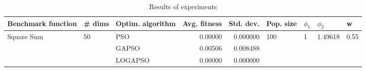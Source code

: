 \begin{table}
\centering
\caption{Results of experiments}
\begin{tabular}{lllrrllll}
\toprule
         Benchmark function &             \# dims & Optim. algorithm &  Avg. fitness &  Std. dev. &            Pop. size &         $\phi_{1}$ &               $\phi_{2}$ &                     w \\
\midrule
\multirow{3}{*}{Square Sum} & \multirow{3}{*}{50} &              PSO &       0.00000 &   0.000000 & \multirow{3}{*}{100} & \multirow{3}{*}{1} & \multirow{3}{*}{1.49618} & \multirow{3}{*}{0.55} \\
                            &                     &            GAPSO &       0.00506 &   0.008488 &                      &                    &                          &                       \\
                            &                     &          LOGAPSO &       0.00000 &   0.000000 &                      &                    &                          &                       \\
\bottomrule
\end{tabular}
\end{table}
